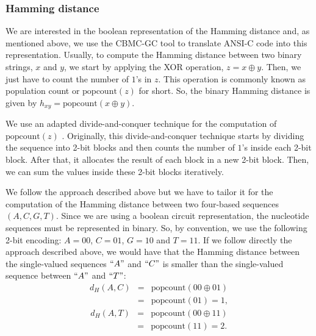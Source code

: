 \subsubsection{Hamming distance}

We are interested in the boolean representation of the Hamming distance and, as mentioned above, we use the CBMC-GC tool to translate ANSI-C code into this representation. Usually, to compute the Hamming distance between two binary strings, $x$ and $y$, we start by applying the XOR operation, $z = x \oplus y$. Then, we just have to count the number of $1$'s in $z$. This operation is commonly known as population count or $\text{popcount}(z)$ for short. So, the binary Hamming distance is given by $h_{xy} = \text{popcount}(x \oplus y)$.

We use an adapted divide-and-conquer technique for the computation of $\text{popcount}(z)$ \cite{W12}. Originally, this divide-and-conquer technique starts by dividing the sequence into 2-bit blocks and then counts the number of $1$'s inside each 2-bit block. After that, it allocates the result of each block in a new 2-bit block. Then, we can sum the values inside these 2-bit blocks iteratively. %

We follow the approach described above but we have to tailor it for the computation of the Hamming distance between two four-based sequences $(A, C, G, T)$. Since we are using a boolean circuit representation, the nucleotide sequences must be represented in binary. So, by convention, we use the following 2-bit encoding: $A = 00$, $C=01$, $G=10$ and $T=11$. If we follow directly the approach described above, we would have that the Hamming distance between the single-valued sequences $``A"$ and $``C"$ is smaller than the single-valued sequence between $``A"$ and $``T"$:
\begin{eqnarray*}
d_H(A, C) &=& \text{popcount}(00 \oplus 01)\\
&=& \text{popcount}(01) = 1,
\end{eqnarray*}
\begin{eqnarray*}
d_H(A, T) &=& \text{popcount}(00 \oplus 11)\\
&=& \text{popcount}(11) = 2.
\end{eqnarray*}

